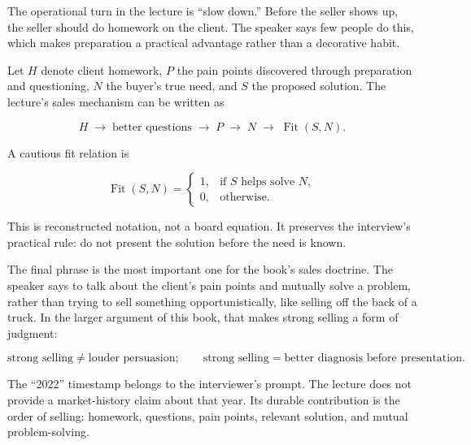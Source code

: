 \documentclass[11pt,oneside]{book}
\begin{document}
The operational turn in the lecture is ``slow down.'' Before the seller shows up, the seller should do homework on the client. The speaker says few people do this, which makes preparation a practical advantage rather than a decorative habit.

Let \(H\) denote client homework, \(P\) the pain points discovered through preparation and questioning, \(N\) the buyer's true need, and \(S\) the proposed solution. The lecture's sales mechanism can be written as

\[
H
\;\longrightarrow\;
\text{better questions}
\;\longrightarrow\;
P
\;\longrightarrow\;
N
\;\longrightarrow\;
\operatorname{Fit}(S,N).
\]

A cautious fit relation is

\[
\operatorname{Fit}(S,N)=
\begin{cases}
1, & \text{if } S \text{ helps solve } N,\\
0, & \text{otherwise.}
\end{cases}
\]

This is reconstructed notation, not a board equation. It preserves the interview's practical rule: do not present the solution before the need is known.

The final phrase is the most important one for the book's sales doctrine. The speaker says to talk about the client's pain points and mutually solve a problem, rather than trying to sell something opportunistically, like selling off the back of a truck. In the larger argument of this book, that makes strong selling a form of judgment:

\[
\text{strong selling}
\neq
\text{louder persuasion};
\qquad
\text{strong selling}
=
\text{better diagnosis before presentation}.
\]

\begin{remark}
The ``2022'' timestamp belongs to the interviewer's prompt. The lecture does not provide a market-history claim about that year. Its durable contribution is the order of selling: homework, questions, pain points, relevant solution, and mutual problem-solving.
\end{remark}

\end{document}
